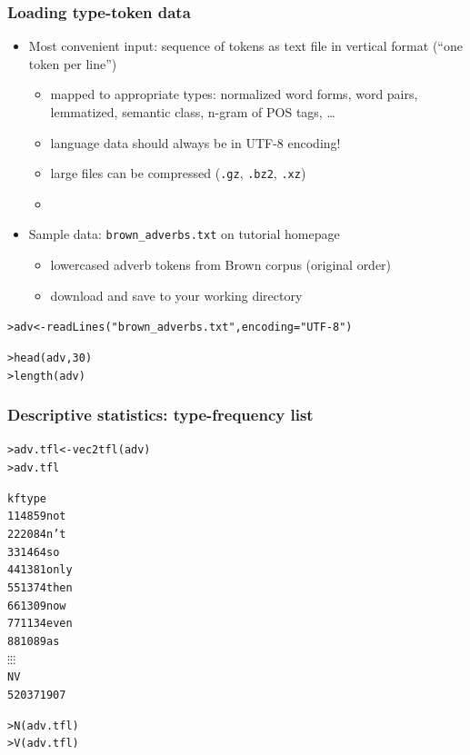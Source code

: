 \documentclass[t]{beamer} %
\begin{document}
\begin{frame}[fragile]
  \frametitle{Loading type-token data}

  \begin{itemize}
  \item Most convenient input: sequence of tokens as text file in vertical format (``one token per line'')
    \begin{itemize}
    \item[\hand] mapped to appropriate types: normalized word forms, word pairs, lemmatized, semantic class, n-gram of POS tags, \ldots
    \item[\hand] language data should always be in UTF-8 encoding!
    \item[\hand] large files can be compressed (\texttt{.gz}, \texttt{.bz2}, \texttt{.xz})
    \item[]
    \end{itemize}
  \item<2-> Sample data: \verb|brown_adverbs.txt| on tutorial homepage
    \begin{itemize}
    \item lowercased adverb tokens from Brown corpus (original order)
    \item[\hand] download and save to your working directory
    \end{itemize}
  \end{itemize}

\begin{alltt}
> adv <- readLines("brown_adverbs.txt", encoding="UTF-8")

> head(adv, 30) 
> length(adv)   
\end{alltt}
\end{frame}

\begin{frame}[fragile]
  \frametitle{Descriptive statistics: type-frequency list}

  \ungap[1]
\begin{alltt}
> adv.tfl <- vec2tfl(adv)
> adv.tfl \begin{Rout}
    k    f  type
1   1 4859   not
2   2 2084   n't
3   3 1464    so
4   4 1381  only
5   5 1374  then
6   6 1309   now
7   7 1134  even
8   8 1089    as
    \(\vdots\)    \(\vdots\)     \(\vdots\)
     N    V
 52037 1907
\end{Rout}
> N(adv.tfl)  
> V(adv.tfl)  
\end{alltt}
\end{frame}
\end{document}
